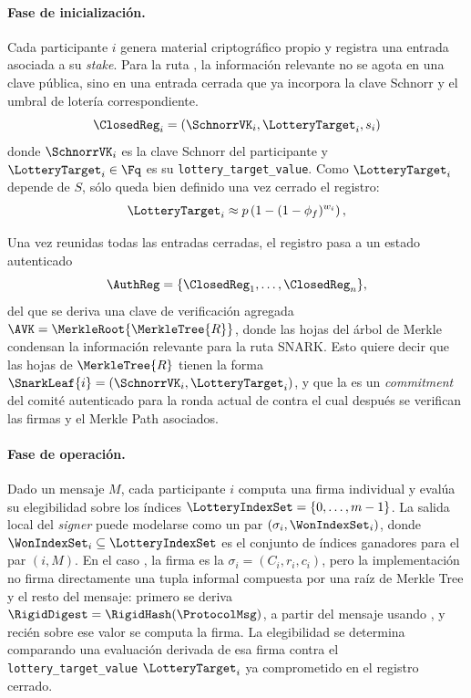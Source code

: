 \paragraph{Fase de inicialización.}

Cada participante $i$ genera material criptográfico propio y registra una entrada asociada a su \textit{stake}. Para la ruta \Lagrange, la información relevante no se agota en una clave pública, sino en una entrada cerrada que ya incorpora la clave Schnorr y el umbral de lotería correspondiente.
$$\ClosedReg_i = \left(\SchnorrVK_i,\LotteryTarget_i,s_i\right)$$
donde $\SchnorrVK_i$ es la clave Schnorr del participante y $\LotteryTarget_i \in \Fq$ es su \texttt{lottery\_target\_value}. Como $\LotteryTarget_i$ depende de $S$, sólo queda bien definido una vez cerrado el registro:
$$\LotteryTarget_i \approx p \left(1-(1-\phi_f)^{w_i}\right),$$

Una vez reunidas todas las entradas cerradas, el registro pasa a un estado autenticado
$$\AuthReg = \{\ClosedReg_1,\ldots,\ClosedReg_n\},$$
del que se deriva una clave de verificación agregada $\AVK = \MerkleRoot{\MerkleTree{R}}$, donde las hojas del árbol de Merkle condensan la información relevante para la ruta SNARK. Esto quiere decir que las hojas de $\MerkleTree{R}$ tienen la forma $\SnarkLeaf{i} = \left(\SchnorrVK_i,\LotteryTarget_i\right)$, y que la \AVK es un \textit{commitment} del comité autenticado para la ronda actual de \STM contra el cual después se verifican las firmas y el Merkle Path asociados.

\paragraph{Fase de operación.}

Dado un mensaje $M$, cada participante $i$ computa una firma individual y evalúa su elegibilidad sobre los índices $\LotteryIndexSet = \{0,\ldots,m-1\}$. La salida local del \textit{signer} puede modelarse como un par
$(\sigma_i, \WonIndexSet_i)$, donde $\WonIndexSet_i \subseteq \LotteryIndexSet$ es el conjunto de índices ganadores para el par $(i, M)$. En el caso \Lagrange, la firma es la \UniqueSchnorrSignature $\sigma_i = (C_i, r_i, c_i)$, pero la implementación no firma directamente una tupla informal compuesta por una raíz de Merkle Tree y el resto del mensaje: primero se deriva $\RigidDigest = \RigidHash(\ProtocolMsg)$, a partir del mensaje \ProtocolMsg usando \ProtocolMessageComputeHash, y recién sobre ese valor se computa la firma. La elegibilidad se determina comparando una evaluación derivada de esa firma contra el \texttt{lottery\_target\_value} $\LotteryTarget_i$ ya comprometido en el registro cerrado.

